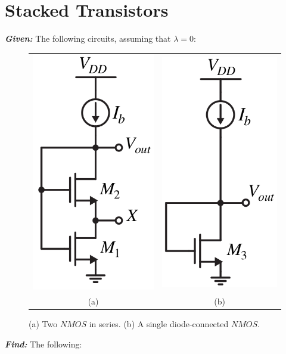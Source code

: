 \documentclass[12pt, fleqn]{article}
\begin{document}
\section{Stacked Transistors}
\textbf{\emph{Given: }} The following circuits, assuming that $\lambda = 0$:
\begin{figure}[H]
\centering
\begin{tabular}{cc}
\includegraphics[width=.25\columnwidth]{p2a.png} \qquad\qquad & \qquad\qquad
\includegraphics[width=.25\columnwidth]{p2b.png}\\
(a) \qquad\qquad & \qquad\qquad (b)\\
\end{tabular}
\caption{(a) Two $NMOS$ in series.  (b) A single diode-connected $NMOS$.}
\label{fig:circuits}
\end{figure}
\noindent
\textbf{\emph{Find: }} The following:
\end{document}
